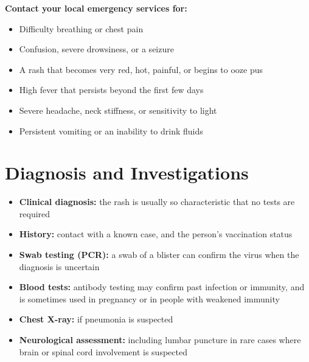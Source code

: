 \medskip
\textbf{Contact your local emergency services for:}
\begin{itemize}
    \item Difficulty breathing or chest pain
    \item Confusion, severe drowsiness, or a seizure
    \item A rash that becomes very red, hot, painful, or begins to ooze pus
    \item High fever that persists beyond the first few days
    \item Severe headache, neck stiffness, or sensitivity to light
    \item Persistent vomiting or an inability to drink fluids
\end{itemize}

\section*{Diagnosis and Investigations}
\begin{itemize}
    \item \textbf{Clinical diagnosis:} the rash is usually so characteristic that no tests are required
    \item \textbf{History:} contact with a known case, and the person's vaccination status
    \item \textbf{Swab testing (PCR):} a swab of a blister can confirm the virus when the diagnosis is uncertain
    \item \textbf{Blood tests:} antibody testing may confirm past infection or immunity, and is sometimes used in pregnancy or in people with weakened immunity
    \item \textbf{Chest X-ray:} if pneumonia is suspected
    \item \textbf{Neurological assessment:} including lumbar puncture in rare cases where brain or spinal cord involvement is suspected
\end{itemize}


